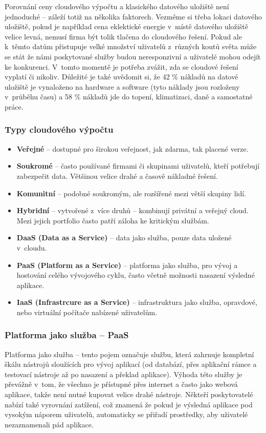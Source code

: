 \par Porovnání ceny cloudového výpočtu a klasického datového uložiště není jednoduché -- záleží totiž na několika faktorech. Vezměme si třeba lokaci datového uložiště, pokud je například cena eklektické energie v~místě datového uložiště velice levná, nemusí firma být tolik tlačena do cloudového řešení. Pokud ale k~těmto datům přistupuje velké množství uživatelů z~různých koutů světa může se stát že námi poskytované služby budou neresponzivní a uživatelé mohou odejít ke konkurenci. V~tomto momentě je potřeba zvážit, zda se cloudové řešení vyplatí či nikoliv. Důležité je také uvědomit si, že 42 \% nákladů na datové uložiště je vynaloženo na hardware a software (tyto náklady jsou rozloženy v~průběhu času) a 58 \% nákladů jde do topení, klimatizaci, daně a samostatné práce. \cite{cloud-computing-dummies}

\subsubsection{Typy cloudového výpočtu}
\begin{itemize}
\item \textbf{Veřejné} -- dostupné pro širokou veřejnost, jak zdarma, tak placené verze.
\item \textbf{Soukromé} -- často používané firmami či skupinami uživatelů, kteří potřebují zabezpečit data. Většinou velice drahé a časově nákladné řešení.
\item \textbf{Komunitní} -- podobné soukromým, ale rozšířené mezi větší skupiny lidí.
\item \textbf{Hybridní} -- vytvořené z~více druhů -- kombinují privátní a veřejný cloud. Mezi jejich portfolio často patří záloha ke kritickým službám.
\item \textbf{DaaS (Data as a Service)} -- data jako služba, pouze data uložené v~cloudu.
\item \textbf{PaaS (Platform as a Service)} -- platforma jako služba, pro vývoj a hostování celého vývojového cyklu, často včetně možnosti nasazení výsledné aplikace.
\item \textbf{IaaS (Infrastrcure as a Service)} -- infrastruktura jako služba, opravdové, nebo virtuální počítače nabízené uživatelům. \cite{cloud-computing} \label{IaaS}
\end{itemize}

\subsubsection{Platforma jako služba -- PaaS}
Platforma jako služba -- tento pojem označuje službu, která zahrnuje kompletní škálu nástrojů sloužících pro vývoj aplikací (od databází, přes aplikační rámce a testovací nástroje až po nasazení a překlad aplikace). Výhoda této služby je převážně v~tom, že všechno je přístupné přes internet a často jako webová aplikace, takže není nutné kupovat velice drahé nástroje. Někteří poskytovatelé nabízí také vyrovnání zatížení, což znamená že pokud je výsledná aplikace pod vysokým náporem uživatelů, automaticky se přiřadí prostředky, aby uživatelé nezaznamenali pád aplikace. \cite{essentials-cloud}

